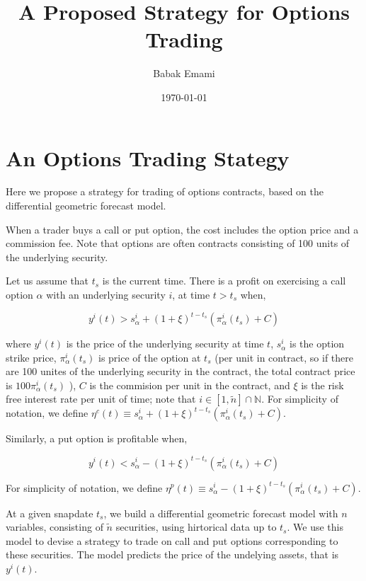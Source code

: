\documentclass{article}
\title{A Proposed Strategy for Options Trading}
\author{Babak Emami}
\date{\today}
\begin{document}
\maketitle

\section{An Options Trading Stategy}\label{section:options_trading}

Here we propose a strategy for trading of options contracts, based on
the differential geometric forecast model.

When a trader buys a call or put option, the cost includes the option
price and a commission fee. Note that options are often contracts
consisting of 100 units of the underlying security. 

Let us assume that $t_{s}$ is the current time. There is a profit on
exercising a call option $\alpha$ with an underlying security $i$, at
time $t > t_{s}$ when,

\begin{equation}\label{eqn:call-option-condition}
y^{i}(t) > s^{i}_{\alpha} + ( 1 + \xi )^{t-t_{s}} ( \pi^{i}_{\alpha}(t_{s}) + C )
\end{equation}

where $y^{i}(t)$ is the price of the underlying security at time $t$,
$s^{i}_{\alpha}$ is the option strike price, $\pi^{i}_{\alpha}(t_{s})$
is price of the option at $t_{s}$ (per unit in contract, so if there
are 100 unites of the underlying security in the contract, the total
contract price is $100 \pi^{i}_{\alpha}(t_{s})$ ), $C$ is the
commision per unit in the contract, and $\xi$ is the risk free
interest rate per unit of time; note that $i \in [1,\tilde{n}] \cap
\mathbb{N}$. For simplicity of notation, we define $\eta^{c}(t) \equiv
s^{i}_{\alpha} + ( 1 + \xi )^{t-t_{s}} ( \pi^{i}_{\alpha}(t_{s}) + C
)$.

Similarly, a put option is profitable when,

\begin{equation}\label{eqn:put-option-condition}
y^{i}(t) < s^{i}_{\alpha} - ( 1 + \xi )^{t-t_{s}} ( \pi^{i}_{\alpha}(t_{s}) + C )
\end{equation}

For simplicity of notation, we define $\eta^{p}(t) \equiv
s^{i}_{\alpha} - ( 1 + \xi )^{t-t_{s}} ( \pi^{i}_{\alpha}(t_{s}) + C )$.

At a given snapdate $t_{s}$, we build a differential geometric
forecast model with $n$ variables, consisting of $\tilde{n}$
securities, using hirtorical data up to $t_{s}$. We use this model to
devise a strategy to trade on call and put options corresponding to
these securities. The model predicts the price of the undelying
assets, that is $y^{i}(t)$.
\end{document}
